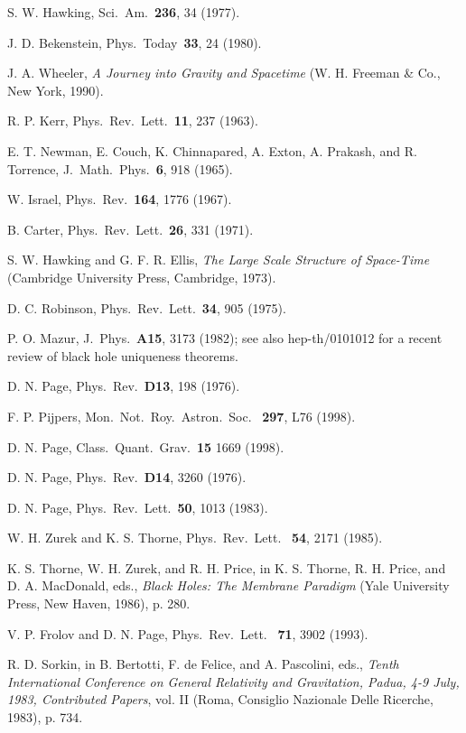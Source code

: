 \documentclass[12pt]{article} \usepackage{latexsym} \textwidth 15cm
\begin{document}
\begin{thebibliography}{99}
 S. W. Hawking, Sci.\ Am.\ {\bf 236}, 34 (1977).

 J. D. Bekenstein, Phys.\ Today\ {\bf 33}, 24 (1980).

 J. A. Wheeler, \emph{A Journey into Gravity and
  Spacetime} (W. H. Freeman \& Co., New York, 1990).

 R. P. Kerr, Phys.\ Rev.\ Lett.\ {\bf 11}, 237 (1963).

 E. T. Newman, E. Couch, K. Chinnapared, A. Exton,
  A. Prakash, and R. Torrence, J.\ Math.\ Phys.\ {\bf 6}, 918 (1965).

 W. Israel, Phys.\ Rev.\ {\bf 164}, 1776 (1967).

 B. Carter,  Phys.\ Rev.\ Lett.\ {\bf 26}, 331 (1971).

 S. W. Hawking and G. F. R. Ellis, \emph{The Large Scale
  Structure of Space-Time} (Cambridge University Press, Cambridge,
  1973).

 D. C. Robinson, Phys.\ Rev.\ Lett.\ {\bf 34}, 905
  (1975).

 P. O. Mazur, J.\ Phys.\ {\bf A15}, 3173 (1982); see
  also hep-th/0101012 for a recent review of black hole uniqueness
  theorems.

 D. N. Page, Phys.\ Rev.\ {\bf D13}, 198 (1976).

 F. P. Pijpers, Mon.\ Not.\ Roy.\ Astron.\ Soc.\ {\bf
  297}, L76 (1998).

 D. N. Page, Class.\ Quant.\ Grav.\ {\bf 15} 1669 (1998).

 D. N. Page, Phys.\ Rev.\ {\bf D14}, 3260 (1976).

 D. N. Page, Phys.\ Rev.\ Lett.\ {\bf 50}, 1013
  (1983).

 W. H. Zurek and K. S. Thorne, Phys.\ Rev.\ Lett.\ {\bf
  54}, 2171 (1985).

 K. S. Thorne, W. H. Zurek, and R. H. Price, in
  K. S. Thorne, R. H. Price, and D. A. MacDonald, eds., \emph{Black
  Holes: The Membrane Paradigm} (Yale University Press, New Haven,
  1986), p. 280.

 V. P. Frolov and D. N. Page, Phys.\ Rev.\ Lett.\ {\bf
  71}, 3902 (1993).

 R. D. Sorkin, in B. Bertotti, F. de Felice, and
  A. Pascolini, eds., \emph{Tenth International Conference on General
  Relativity and Gravitation, Padua, 4-9 July, 1983, Contributed
  Papers}, vol. II (Roma, Consiglio Nazionale Delle Ricerche,
  1983), p. 734.


\end{thebibliography}
\end{document}
